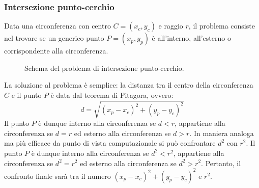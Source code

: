 \subsubsection{Intersezione punto-cerchio}
Data una circonferenza con centro $C = (x_c, y_c)$ e raggio $r$, il problema consiste nel trovare se un generico punto $P = (x_p, y_p)$ è all'interno, all'esterno o corrispondente alla circonferenza.

\begin{figure}[h]
	\centering
	\caption{Schema del problema di intersezione punto-cerchio.}
\end{figure}
La soluzione al problema è semplice: la distanza tra il centro della circonferenza $C$ e il punto $P$ è data dal teorema di Pitagora, ovvero:
\begin{equation}
	d=\sqrt{(x_p-x_c)^2 + (y_p-y_c)^2}
\end{equation}
Il punto $P$ è dunque interno alla circonferenza se $d<r$, appartiene alla circonferenza se $d=r$ ed esterno alla circonferenza se $d>r$. In maniera analoga ma più efficace da punto di vista computazionale si può confrontare $d^2$ con $r^2$. Il punto $P$ è dunque interno alla circonferenza se $d^2<r^2$,  appartiene alla circonferenza se $d^2=r^2$ ed esterno alla circonferenza se $d^2>r^2$. Pertanto, il confronto finale sarà tra il numero $(x_p-x_c)^2+(y_p-y_c)^2 $ e $r^2$.


